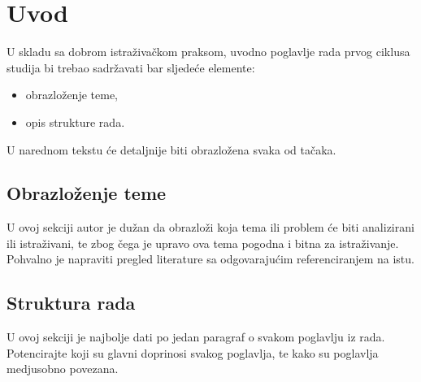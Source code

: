 \chapter{Uvod}

U skladu sa dobrom istraživačkom praksom, uvodno poglavlje rada prvog ciklusa studija bi trebao sadržavati bar sljedeće elemente: 
\begin{itemize}
\item {obrazloženje teme,}
\item {opis strukture rada.}
\end{itemize}

U narednom tekstu će detaljnije biti obrazložena svaka od tačaka.

\section{Obrazloženje teme}
U ovoj sekciji autor je dužan da obrazloži koja tema ili problem će biti analizirani ili istraživani, te zbog čega je upravo ova tema pogodna i bitna za istraživanje. Pohvalno je napraviti pregled literature sa odgovarajućim referenciranjem na istu.

\section{Struktura rada}
U ovoj sekciji je najbolje dati po jedan paragraf o svakom poglavlju iz rada. Potencirajte koji su glavni doprinosi svakog poglavlja, te kako su poglavlja medjusobno povezana.




